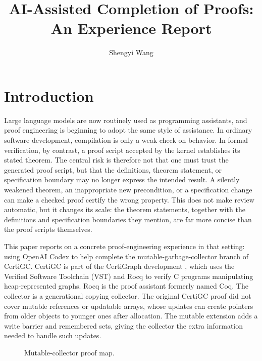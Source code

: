\documentclass[acmsmall,nonacm]{acmart}
\title[AI-Assisted Completion of CertiGC Proofs]{AI-Assisted Completion of
\CertiGC{} Proofs:\texorpdfstring{\\ }{ }An Experience Report}
\author{Shengyi Wang}
\affiliation{%
  \institution{Shanghai Qi Zhi Institute}
  \city{Shanghai}
  \country{China}
}
\newcommand{\Rocq}{Rocq}
\newcommand{\Coq}{Coq}
\newcommand{\CertiGC}{CertiGC}
\newcommand{\CertiGraph}{CertiGraph}
\newcommand{\VST}{VST}
\begin{document}
\maketitle

\section{Introduction}

Large language models are now routinely used as programming
assistants, and proof engineering is beginning to adopt the same style
of assistance.  In ordinary software development, compilation is only
a weak check on behavior.  In formal verification, by contrast, a
proof script accepted by the kernel establishes its stated theorem.
The central risk is therefore not that one must trust the generated
proof script, but that the definitions, theorem statement, or
specification boundary may no longer express the intended result.  A
silently weakened theorem, an inappropriate new precondition, or a
specification change can make a checked proof certify the wrong
property.  This does not make review automatic, but it changes its
scale: the theorem statements, together with the definitions and
specification boundaries they mention, are far more concise than the
proof scripts themselves.

This paper reports on a concrete proof-engineering experience in that
setting: using OpenAI Codex \citep{openai2025codex,openai2026codexapp}
to help complete the mutable-garbage-collector branch of \CertiGC{}.
\CertiGC{} is part of the \CertiGraph{} development
\citep{wang2019certigraph}, which uses the Verified Software Toolchain
(\VST{}) \citep{appel2014programlogics} and \Rocq{} to verify C
programs manipulating heap-represented graphs.  \Rocq{} is the proof
assistant formerly named \Coq{}.  The collector is a generational
copying collector.  The original CertiGC proof did not cover mutable
references or updatable arrays, whose updates can create pointers from
older objects to younger ones after allocation.  The mutable extension
adds a write barrier and remembered sets, giving the collector the
extra information needed to handle such updates.

\begin{figure}[htbp]
\centering
\resizebox{\textwidth}{!}{}
\caption{Mutable-collector proof map.}
\label{fig:gc-proof-map}
\end{figure}
\end{document}
